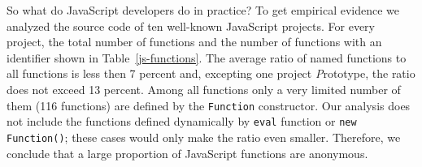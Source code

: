 \documentclass[10pt, preprint]{sigplanconf}
\begin{document}
So what do JavaScript developers do in practice?  To get empirical evidence we analyzed the source code of ten well-known JavaScript projects. For every project, the total number of functions and the number of functions with an identifier shown in Table~\ref{js-functions}. The average ratio of named functions to all functions is less then 7 percent and, excepting one project {\textit Prototype}, the ratio does not exceed 13 percent. Among all functions only a very limited number of them (116 functions) are defined by the {\small\texttt{Function}} constructor. Our analysis does not include the functions defined dynamically by {\small\texttt{eval}} function or {\small\texttt{new Function()}}; these cases would only make the ratio even smaller.  Therefore, we conclude that a large proportion of JavaScript functions are anonymous.



\begin{table}
\centering
{}
\caption{The total number of functions and the number of named functions (and percent named)  in ten large JavaScript projects. See appendix 1 for the project citations.}
\label{js-functions} 
\end{table}    
\end{document}
